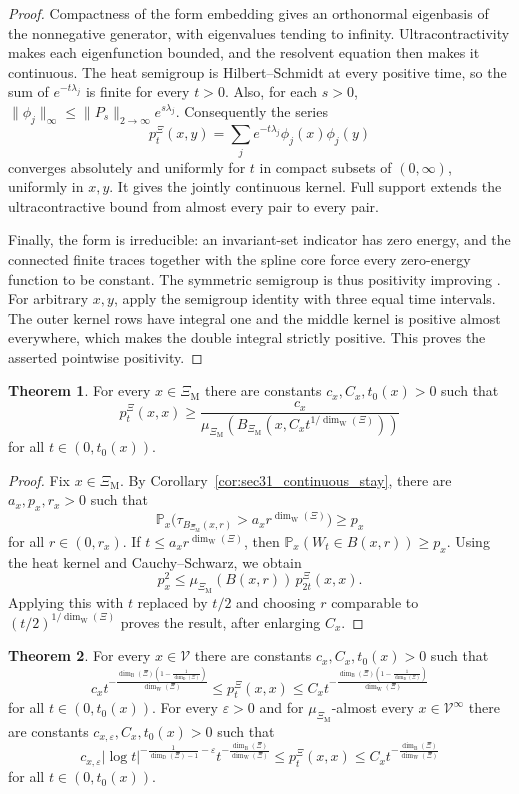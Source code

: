 \documentclass{article}
\theoremstyle{plain}
\theoremstyle{definition}
\newtheorem{theorem}{Theorem}[section]
\newcommand{\dimbox}{\dim_\mathrm{B}}
\newcommand{\dimdeg}{\dim_\mathrm{D}}
\newcommand{\dimwalk}{\dim_\mathrm{W}}
\begin{document}
\begin{proof}
Compactness of the form embedding gives an orthonormal eigenbasis of the
nonnegative generator, with eigenvalues tending to infinity.
Ultracontractivity makes each eigenfunction bounded, and the resolvent
equation then makes it continuous. The heat semigroup is Hilbert--Schmidt
at every positive time, so the sum of $e^{-t\lambda_j}$ is finite for
every $t>0$. Also, for each $s>0$,
$\|\phi_j\|_\infty\le\|P_s\|_{2\to\infty}e^{s\lambda_j}$.
Consequently the series
\[
p_t^\Xi(x,y)=\sum_j e^{-t\lambda_j}\phi_j(x)\phi_j(y)
\]
converges absolutely and uniformly for $t$ in compact subsets of
$(0,\infty)$, uniformly in $x,y$. It gives the jointly continuous kernel.
Full support extends the ultracontractive bound from almost every pair
to every pair.

Finally, the form is irreducible: an invariant-set indicator has zero
energy, and the connected finite traces together with the spline core
force every zero-energy function to be constant. The symmetric semigroup
is thus positivity improving \cite{fukushima1994dirichlet}.
For arbitrary $x,y$, apply the semigroup identity with three equal time
intervals. The outer kernel rows have integral one and the middle
kernel is positive almost everywhere, which makes the double integral
strictly positive. This proves the asserted pointwise positivity.
\end{proof}
\endgroup{}


\begin{theorem}\label{thm:general-lower}
For every $x\in \Xi_{\mathrm M}$ there are constants $c_x,C_x,t_0(x)>0$ such that
\[
p_t^\Xi(x,x)
\ge
\frac{c_x}{\mu_{\Xi_{\mathrm M}}(B_{\Xi_{\mathrm M}}(x,C_x t^{1/\dimwalk(\Xi)}))}
\]
for all $t\in(0,t_0(x))$.
\end{theorem}

\begin{proof}
Fix $x\in \Xi_{\mathrm M}$.
By Corollary~\ref{cor:sec31_continuous_stay}, there are $a_x,p_x,r_x>0$ such that
\[
\mathbb P_x\bigl(\tau_{B_{\Xi_{\mathrm M}}(x,r)}>a_xr^{\dimwalk(\Xi)}\bigr)\ge p_x
\]
for all $r\in(0,r_x)$.
If $t\le a_xr^{\dimwalk(\Xi)}$, then $\mathbb P_x(W_t\in B(x,r))\ge p_x$.
Using the heat kernel and Cauchy--Schwarz, we obtain
\[
p_x^2
\le
\mu_{\Xi_{\mathrm M}}(B(x,r))\,p_{2t}^\Xi(x,x).
\]
Applying this with $t$ replaced by $t/2$ and choosing $r$ comparable to $(t/2)^{1/\dimwalk(\Xi)}$ proves the result, after enlarging $C_x$.
\end{proof}

\begin{theorem}\label{thm:diffusion-heat}
For every $x\in \mathscr V$ there are constants $c_x,C_x,t_0(x)>0$ such that
\[
c_x t^{-\frac{\dimbox(\Xi)\left(1-\frac{1}{\dimdeg(\Xi)}\right)}{\dimwalk(\Xi)}}
\le
p_t^\Xi(x,x)
\le
C_x t^{-\frac{\dimbox(\Xi)\left(1-\frac{1}{\dimdeg(\Xi)}\right)}{\dimwalk(\Xi)}}
\]
for all $t\in(0,t_0(x))$.
For every $\varepsilon>0$ and for $\mu_{\Xi_{\mathrm M}}$-almost every $x\in \mathscr V^\infty$ there are constants $c_{x,\varepsilon},C_x,t_0(x)>0$ such that
\[
c_{x,\varepsilon} |\log t|^{-\frac{1}{\dimdeg(\Xi)-1}-\varepsilon} t^{-\frac{\dimbox(\Xi)}{\dimwalk(\Xi)}}
\le
p_t^\Xi(x,x)
\le
C_x t^{-\frac{\dimbox(\Xi)}{\dimwalk(\Xi)}}
\]
for all $t\in(0,t_0(x))$.
\end{theorem}
\end{document}
